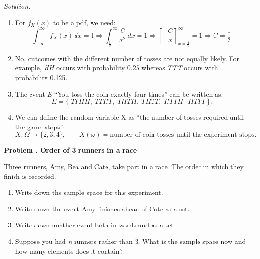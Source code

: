 \documentclass[11pt]{article}
\newcounter{problem}
\newenvironment{problem}[1][]{%
  \refstepcounter{problem}%
  \bigskip\noindent\textbf{Problem \theproblem. #1}\par\smallskip\noindent
}{\bigskip}
\newenvironment{solution}{%
  \noindent\textit{Solution.}\quad
}{\par\bigskip}
\begin{document}
\begin{solution}
\begin{enumerate}
      \item For $f_{X}(x)$ to be a pdf, we need:
            \[
            \int_{-\infty}^{\infty} f_{X}(x)\,dx = 1
            \Rightarrow \int_{\frac{1}{2}}^{\infty} \frac{C}{x^2}\,dx = 1
            \Rightarrow \left[-\frac{C}{x}\right]_{x=\tfrac{1}{2}}^{\infty} = 1
            \Rightarrow C = \frac{1}{2}
            \]
      \item No, outcomes with the different number of tosses are not equally likely. 
            For example, \textit{HH} occurs with probability 0.25 whereas \textit{TTT} 
            occurs with probability 0.125.
      \item The event \textit{E} ``You toss the coin exactly four times'' can be written as:
            \[
            E = \{\;TTHH,\;TTHT,\;THTH,\;THTT,\;HTTH,\;HTTT\,\}.
            \]
      \item We can define the random variable X as ``the number of tosses required until the game stops'':
            \[
            X : \Omega \to \{2,3,4\}, \qquad
            X(\omega) = \text{number of coin tosses until the experiment stops}.
            \]
\end{enumerate}
\end{solution}

\begin{problem}[Order of 3 runners in a race]
Three runners, Amy, Bea and Cate, take part in a race. The order in which they finish
is recorded.
\begin{enumerate}
      \item Write down the sample space for this experiment.
      \item Write down the event Amy finishes ahead of Cate as a set.
      \item Write down another event both in words and as a set.
      \item Suppose you had \textit{n} runners rather than 3. What is the sample space now 
            and how many elements does it contain?
\end{enumerate}
\end{problem}
\end{document}
